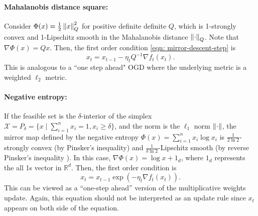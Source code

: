 \paragraph{Mahalanobis distance square:} Consider $\Phi(x) = \frac{1}{2} \left\lVert x \right\rVert_Q^2$ for positive definite definite $Q$, which is 1-strongly convex and 1-Lipschitz smooth in the Mahalanobis distance $\left\lVert \cdot \right\rVert_Q$.  Note that $\nabla \Phi(x) = Qx$.  Then, the first order condition \eqref{eqn: mirror-descent-step} is 
\begin{equation}
x_t = x_{t-1} - \eta_t Q^{-1} \nabla f_t(x_t).
\label{eqn: one-step-ahead-weighted-GD}
\end{equation}
This is analogous to a ``one step ahead" OGD where the underlying metric is a weighted $\ell_2$ metric.

\paragraph{Negative entropy:} If the feasible set is the $\delta$-interior of the simplex $\mathcal{X} = P_\delta = \{ x \mid \sum_{i=1}^n x_i = 1, x_i \ge \delta\}$, and the norm is the $\ell_1$ norm $\left\lVert \cdot \right\rVert$, the mirror map defined by the negative entropy $\Phi(x) = \sum_{i=1}^n x_i \log x_i$ is $\frac{1}{2\ln 2}$-strongly convex (by Pinsker's inequality) and $ \frac{1}{\delta \ln 2}$-Lipschitz smooth (by reverse Pinsker's inequality \citep{sason2015}). In this case, $\nabla \Phi(x) = \log x + 1_d$, where $1_d$ represents the all 1s vector in $\mathbb{R}^d$. Then, the first order condition is 
\begin{equation}
x_t =  x_{t-1}\exp(-\eta_t \nabla f_t(x_t)).
\label{eqn: one-step-ahead-multiplicative-weight}
\end{equation}
This can be viewed as a ``one-step ahead'' version of the multiplicative weights update. Again, this equation should not be interpreted as an update rule since $x_t$ appears on both side of the equation.




